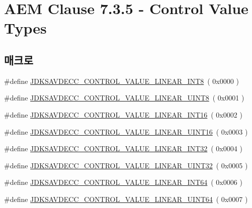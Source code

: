 \hypertarget{group__aem__control__value}{}\section{A\+EM Clause 7.3.5 -\/ Control Value Types}
\label{group__aem__control__value}
\subsection*{매크로}
\begin{DoxyCompactItemize}
\item 
\#define \hyperlink{group__aem__control__value_ga9f9eee599e415df9753535ca02023b63}{J\+D\+K\+S\+A\+V\+D\+E\+C\+C\+\_\+\+C\+O\+N\+T\+R\+O\+L\+\_\+\+V\+A\+L\+U\+E\+\_\+\+L\+I\+N\+E\+A\+R\+\_\+\+I\+N\+T8}~( 0x0000 )
\item 
\#define \hyperlink{group__aem__control__value_gaccaafb50f5757f1e2d770998f3a107c8}{J\+D\+K\+S\+A\+V\+D\+E\+C\+C\+\_\+\+C\+O\+N\+T\+R\+O\+L\+\_\+\+V\+A\+L\+U\+E\+\_\+\+L\+I\+N\+E\+A\+R\+\_\+\+U\+I\+N\+T8}~( 0x0001 )
\item 
\#define \hyperlink{group__aem__control__value_gad0b0ced7f680518e60d43cea9644a120}{J\+D\+K\+S\+A\+V\+D\+E\+C\+C\+\_\+\+C\+O\+N\+T\+R\+O\+L\+\_\+\+V\+A\+L\+U\+E\+\_\+\+L\+I\+N\+E\+A\+R\+\_\+\+I\+N\+T16}~( 0x0002 )
\item 
\#define \hyperlink{group__aem__control__value_ga4d84d178a314ab0ef479b181e9394b69}{J\+D\+K\+S\+A\+V\+D\+E\+C\+C\+\_\+\+C\+O\+N\+T\+R\+O\+L\+\_\+\+V\+A\+L\+U\+E\+\_\+\+L\+I\+N\+E\+A\+R\+\_\+\+U\+I\+N\+T16}~( 0x0003 )
\item 
\#define \hyperlink{group__aem__control__value_gab32cd1ffa67616d78981cc36cebf676a}{J\+D\+K\+S\+A\+V\+D\+E\+C\+C\+\_\+\+C\+O\+N\+T\+R\+O\+L\+\_\+\+V\+A\+L\+U\+E\+\_\+\+L\+I\+N\+E\+A\+R\+\_\+\+I\+N\+T32}~( 0x0004 )
\item 
\#define \hyperlink{group__aem__control__value_gaddb34233fb6f76217bf8004207d3205a}{J\+D\+K\+S\+A\+V\+D\+E\+C\+C\+\_\+\+C\+O\+N\+T\+R\+O\+L\+\_\+\+V\+A\+L\+U\+E\+\_\+\+L\+I\+N\+E\+A\+R\+\_\+\+U\+I\+N\+T32}~( 0x0005 )
\item 
\#define \hyperlink{group__aem__control__value_ga4c623b5498b76a1ea56db8fd86b3c524}{J\+D\+K\+S\+A\+V\+D\+E\+C\+C\+\_\+\+C\+O\+N\+T\+R\+O\+L\+\_\+\+V\+A\+L\+U\+E\+\_\+\+L\+I\+N\+E\+A\+R\+\_\+\+I\+N\+T64}~( 0x0006 )
\item 
\#define \hyperlink{group__aem__control__value_gad4387f8942d943a8b3c682f3c355c965}{J\+D\+K\+S\+A\+V\+D\+E\+C\+C\+\_\+\+C\+O\+N\+T\+R\+O\+L\+\_\+\+V\+A\+L\+U\+E\+\_\+\+L\+I\+N\+E\+A\+R\+\_\+\+U\+I\+N\+T64}~( 0x0007 )

\end{DoxyCompactItemize}
